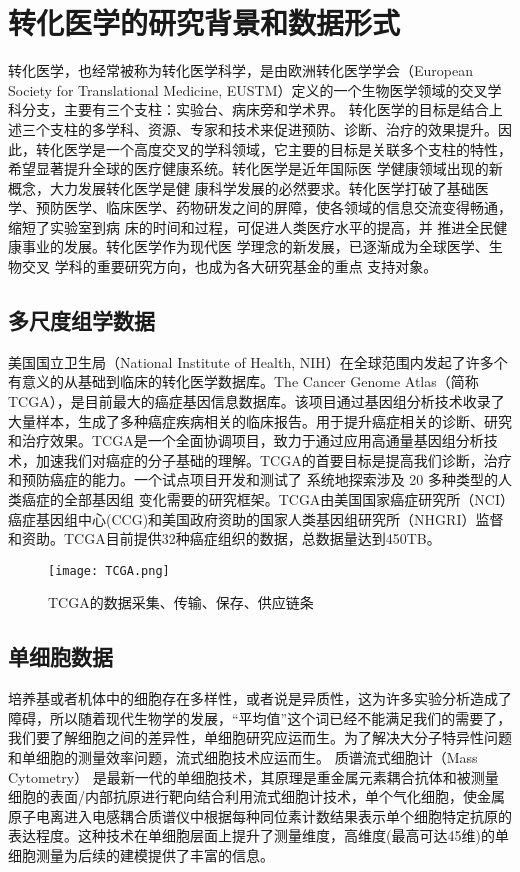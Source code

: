 
\chapter{转化医学的研究背景和数据形式}

转化医学，也经常被称为转化医学科学，是由欧洲转化医学学会（European Society for Translational Medicine, EUSTM）定义的一个生物医学领域的交叉学科分支\cite{Cohrs:2015dw}，主要有三个支柱：实验台、病床旁和学术界。 转化医学的目标是结合上述三个支柱的多学科、资源、专家和技术来促进预防、诊断、治疗的效果提升。因此，转化医学是一个高度交叉的学科领域，它主要的目标是关联多个支柱的特性，希望显著提升全球的医疗健康系统。转化医学是近年国际医 学健康领域出现的新概念，大力发展转化医学是健 康科学发展的必然要求。转化医学打破了基础医 学、预防医学、临床医学、药物研发之间的屏障，使各领域的信息交流变得畅通，缩短了实验室到病 床的时间和过程，可促进人类医疗水平的提高，并 推进全民健康事业的发展。转化医学作为现代医 学理念的新发展，已逐渐成为全球医学、生物交叉 学科的重要研究方向，也成为各大研究基金的重点 支持对象。

\section{多尺度组学数据}
美国国立卫生局（National Institute of Health, NIH）在全球范围内发起了许多个有意义的从基础到临床的转化医学数据库。The Cancer Genome Atlas（简称TCGA），是目前最大的癌症基因信息数据库\cite{Hoadley:2014kd}。该项目通过基因组分析技术收录了大量样本，生成了多种癌症疾病相关的临床报告。用于提升癌症相关的诊断、研究和治疗效果。TCGA是一个全面协调项目，致力于通过应用高通量基因组分析技术，加速我们对癌症的分子基础的理解。TCGA的首要目标是提高我们诊断，治疗和预防癌症的能力。一个试点项目开发和测试了 系统地探索涉及 20 多种类型的人类癌症的全部基因组 变化需要的研究框架。TCGA由美国国家癌症研究所（NCI）癌症基因组中心(CCG)和美国政府资助的国家人类基因组研究所（NHGRI）监督和资助。TCGA目前提供32种癌症组织的数据，总数据量达到450TB。
\begin{figure}[htbp]
	\centering
	\texttt{[image: TCGA.png]}
	\caption{TCGA的数据采集、传输、保存、供应链条}\label{fig:TCGA}
\end{figure}
\section{单细胞数据}
培养基或者机体中的细胞存在多样性，或者说是异质性，这为许多实验分析造成了障碍，所以随着现代生物学的发展，“平均值”这个词已经不能满足我们的需要了，我们要了解细胞之间的差异性，单细胞研究应运而生。为了解决大分子特异性问题和单细胞的测量效率问题，流式细胞技术应运而生\cite{Bendall:2012gz}。
质谱流式细胞计（Mass Cytometry） 是最新一代的单细胞技术，其原理是重金属元素耦合抗体和被测量细胞的表面/内部抗原进行靶向结合利用流式细胞计技术，单个气化细胞，使金属原子电离进入电感耦合质谱仪中根据每种同位素计数结果表示单个细胞特定抗原的表达程度。这种技术在单细胞层面上提升了测量维度，高维度(最高可达45维)的单细胞测量为后续的建模提供了丰富的信息\cite{2011Sci...332..687B}。

